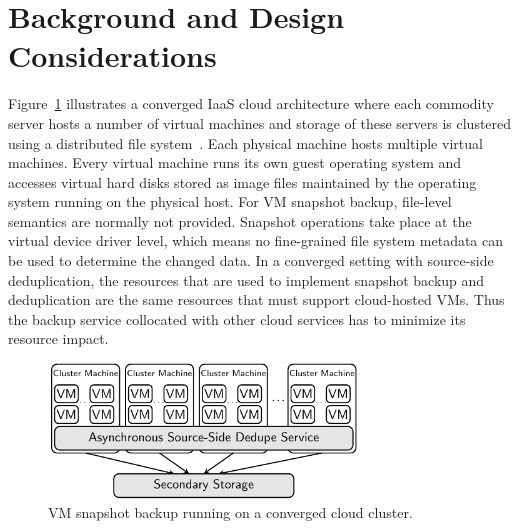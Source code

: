 \section{Background and Design Considerations}
\label{sect:background}

Figure~\ref{fig:collocated} illustrates a converged IaaS cloud architecture 
where
each commodity server hosts a number of virtual machines and storage of these servers
is clustered using a distributed file system~\cite{googlefs03,hdfs10}.
Each physical machine hosts multiple virtual machines.  Every virtual machine
runs its own guest operating system and accesses virtual hard disks 
stored as image files maintained by the operating system running on the
physical host.
For VM snapshot backup, file-level semantics are normally not provided.
Snapshot operations take place at the virtual device driver level, which
means no fine-grained file system metadata can be used to determine the changed data. 
In a converged setting with source-side deduplication, the resources that are used to implement snapshot
backup and deduplication are the same resources that must support cloud-hosted
VMs.  Thus the backup service collocated with 
other cloud services has to minimize its resource impact.  





\begin{figure}[htb]
    \centering
    \includegraphics[width=3.25in]{images/converged_arch}
    \caption{VM snapshot backup running on a converged cloud cluster.}
    \label{fig:collocated}
\end{figure}

